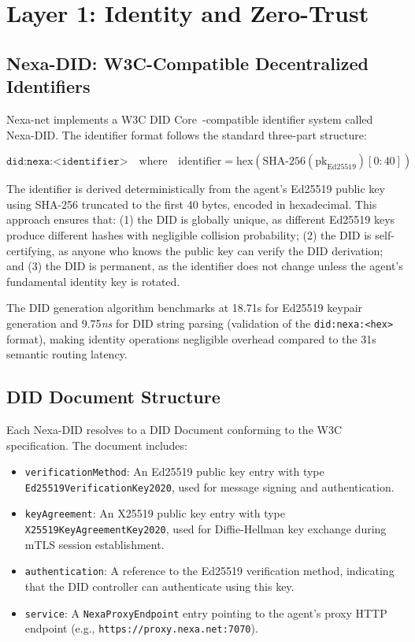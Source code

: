 \section{Layer 1: Identity and Zero-Trust}

\subsection{Nexa-DID: W3C-Compatible Decentralized Identifiers}

Nexa-net implements a W3C DID Core~\cite{w3c_did_2022}-compatible identifier system called Nexa-DID. The identifier format follows the standard three-part structure:

\begin{equation}
\texttt{did:nexa:<identifier>} \quad \text{where} \quad \text{identifier} = \text{hex}(\text{SHA-256}(\text{pk}_{\text{Ed25519}})[0:40])
\end{equation}

The identifier is derived deterministically from the agent's Ed25519 public key using SHA-256 truncated to the first 40 bytes, encoded in hexadecimal. This approach ensures that: (1) the DID is globally unique, as different Ed25519 keys produce different hashes with negligible collision probability; (2) the DID is self-certifying, as anyone who knows the public key can verify the DID derivation; and (3) the DID is permanent, as the identifier does not change unless the agent's fundamental identity key is rotated.

The DID generation algorithm benchmarks at 18.71\textmu s for Ed25519 keypair generation and 9.75\textit{ns} for DID string parsing (validation of the \texttt{did:nexa:<hex>} format), making identity operations negligible overhead compared to the 31\textmu s semantic routing latency.

\subsection{DID Document Structure}

Each Nexa-DID resolves to a DID Document conforming to the W3C specification. The document includes:

\begin{itemize}
  \item \texttt{verificationMethod}: An Ed25519 public key entry with type \texttt{Ed25519VerificationKey2020}, used for message signing and authentication.
  \item \texttt{keyAgreement}: An X25519 public key entry with type \texttt{X25519KeyAgreementKey2020}, used for Diffie-Hellman key exchange during mTLS session establishment.
  \item \texttt{authentication}: A reference to the Ed25519 verification method, indicating that the DID controller can authenticate using this key.
  \item \texttt{service}: A \texttt{NexaProxyEndpoint} entry pointing to the agent's proxy HTTP endpoint (e.g., \texttt{https://proxy.nexa.net:7070}).
\end{itemize}

